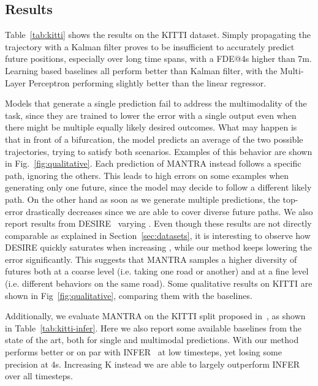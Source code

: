 \documentclass[10pt,twocolumn,letterpaper]{article}
\begin{document}
\subsection{Results}
Table~\ref{tab:kitti} shows the results on the KITTI dataset. Simply propagating the trajectory with a Kalman filter proves to be insufficient to accurately predict future positions, especially over long time spans, with a FDE@4s higher than 7m. Learning based baselines all perform better than Kalman filter, with the Multi-Layer Perceptron performing slightly better than the linear regressor.


Models that generate a single prediction fail to address the multimodality of the task, since they are trained to lower the error with a single output even when there might be multiple equally likely desired outcomes. What may happen is that in front of a bifurcation, the model predicts an average of the two possible trajectories, trying to satisfy both scenarios. Examples of this behavior are shown in Fig.~\ref{fig:qualitative}. Each prediction of MANTRA instead follows a specific path, ignoring the others. This leads to high errors on some examples when generating only one future, since the model may decide to follow a different likely path. On the other hand as soon as we generate  multiple predictions, the top- error drastically decreases since we are able to cover diverse future paths.
We also report results from DESIRE~\cite{lee2017desire} varying . Even though these results are not directly comparable as explained in Section~\ref{sec:datasets}, it is interesting to observe how DESIRE quickly saturates when increasing , while our method keeps lowering the error significantly. This suggests that MANTRA samples a higher diversity of futures both at a coarse level (i.e. taking one road or another) and at a fine level (i.e. different behaviors on the same road).
Some qualitative results on KITTI are shown in Fig~\ref{fig:qualitative}, comparing them with the baselines.

Additionally, we evaluate MANTRA on the KITTI split proposed in~\cite{srikanth2019infer}, as shown in Table~\ref{tab:kitti-infer}. Here we also report some available baselines from the state of the art, both for single and multimodal predictions. With  our method performs better or on par with INFER~\cite{srikanth2019infer} at low timesteps, yet losing some precision at 4s. Increasing K instead we are able to largely outperform INFER over all timesteps.
\end{document}
